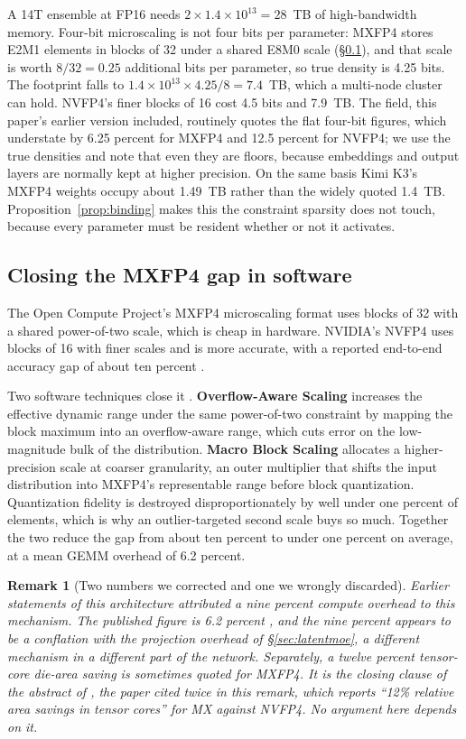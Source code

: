\documentclass[11pt]{article}
\newtheorem{remark}{Remark}
\begin{document}
A 14T ensemble at FP16 needs $2 \times 1.4\times10^{13} = 28$~TB of high-bandwidth memory. Four-bit microscaling is not four bits per parameter: MXFP4 stores E2M1 elements in blocks of 32 under a shared E8M0 scale (\S\ref{sec:mxfp4gap}), and that scale is worth $8/32 = 0.25$ additional bits per parameter, so true density is 4.25 bits. The footprint falls to $1.4\times10^{13} \times 4.25/8 = 7.4$~TB, which a multi-node cluster can hold. NVFP4's finer blocks of 16 cost 4.5 bits and 7.9~TB. The field, this paper's earlier version included, routinely quotes the flat four-bit figures, which understate by 6.25 percent for MXFP4 and 12.5 percent for NVFP4; we use the true densities and note that even they are floors, because embeddings and output layers are normally kept at higher precision. On the same basis Kimi K3's MXFP4 weights occupy about 1.49~TB rather than the widely quoted 1.4~TB. Proposition~\ref{prop:binding} makes this the constraint sparsity does not touch, because every parameter must be resident whether or not it activates.

\subsection{Closing the MXFP4 gap in software}
\label{sec:mxfp4gap}

The Open Compute Project's MXFP4 microscaling format uses blocks of 32 with a shared power-of-two scale, which is cheap in hardware. NVIDIA's NVFP4 uses blocks of 16 with finer scales and is more accurate, with a reported end-to-end accuracy gap of about ten percent \cite{chhugani2026mxfp4}.

Two software techniques close it \cite{chhugani2026mxfp4}. \textbf{Overflow-Aware Scaling} increases the effective dynamic range under the same power-of-two constraint by mapping the block maximum into an overflow-aware range, which cuts error on the low-magnitude bulk of the distribution. \textbf{Macro Block Scaling} allocates a higher-precision scale at coarser granularity, an outer multiplier that shifts the input distribution into MXFP4's representable range before block quantization. Quantization fidelity is destroyed disproportionately by well under one percent of elements, which is why an outlier-targeted second scale buys so much. Together the two reduce the gap from about ten percent to under one percent on average, at a mean GEMM overhead of 6.2 percent.

\begin{remark}[Two numbers we corrected and one we wrongly discarded]
Earlier statements of this architecture attributed a nine percent compute overhead to this mechanism. The published figure is 6.2 percent \cite{chhugani2026mxfp4}, and the nine percent appears to be a conflation with the projection overhead of \S\ref{sec:latentmoe}, a different mechanism in a different part of the network. Separately, a twelve percent tensor-core die-area saving is sometimes quoted for MXFP4. It is the closing clause of the abstract of \cite{chhugani2026mxfp4}, the paper cited twice in this remark, which reports ``12\% relative area savings in tensor cores'' for MX against NVFP4. No argument here depends on it.
\end{remark}
\end{document}

